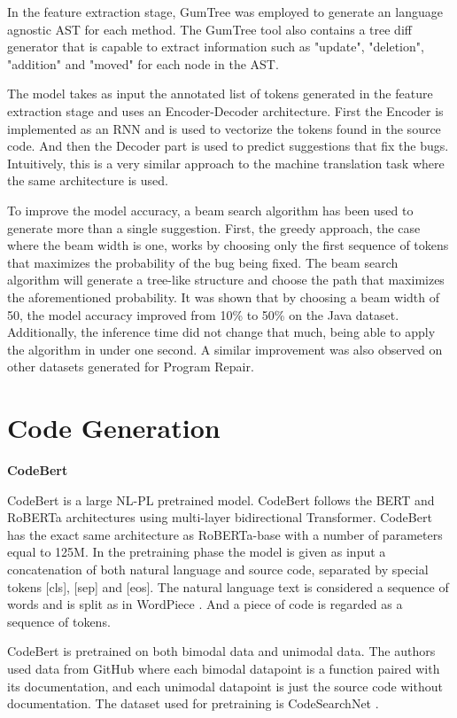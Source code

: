 \documentclass[12pt,a4paper]{report}
\begin{document}
In the feature extraction stage, GumTree \cite{DBLP:conf/kbse/FalleriMBMM14} was employed to generate an language agnostic AST for each method. The GumTree tool also contains a tree diff generator that is capable to extract information such as "update", "deletion", "addition" and "moved" for each node in the AST.

The model takes as input the annotated list of tokens generated in the feature extraction stage and uses an Encoder-Decoder architecture. First the Encoder is implemented as an RNN and is used to vectorize the tokens found in the source code. And then the Decoder part is used to predict suggestions that fix the bugs. Intuitively, this is a very similar approach to the machine translation task where the same architecture is used.

To improve the model accuracy, a beam search algorithm has been used to generate more than a single suggestion. First, the greedy approach, the case where the beam width is one, works by choosing only the first sequence of tokens that maximizes the probability of the bug being fixed. The beam search algorithm will generate a tree-like structure and choose the path that maximizes the aforementioned probability. It was shown that by choosing a beam width of 50, the model accuracy improved from 10\% to 50\% on the Java dataset. Additionally, the inference time did not change that much, being able to apply the algorithm in under one second. A similar improvement was also observed on other datasets generated for Program Repair.

\section{Code Generation}

\textbf{CodeBert}

CodeBert \cite{https://doi.org/10.48550/arxiv.2002.08155} is a large NL-PL pretrained model. CodeBert follows the BERT and RoBERTa architectures using multi-layer bidirectional Transformer. CodeBert has the exact same architecture as RoBERTa-base with a number of parameters equal to 125M. In the pretraining phase the model is given as input a concatenation of both natural language and source code, separated by special tokens [cls], [sep] and [eos]. The natural language text is considered a sequence of words and is split as in WordPiece \cite{https://doi.org/10.48550/arxiv.1609.08144}. And a piece of code is regarded as a sequence of tokens. 

CodeBert is pretrained on both bimodal data and unimodal data. The authors used data from GitHub where each bimodal datapoint is a function paired with its documentation, and each unimodal datapoint is just the source code without documentation. The dataset used for pretraining is CodeSearchNet \cite{https://doi.org/10.48550/arxiv.1909.09436}. 
\end{document}
